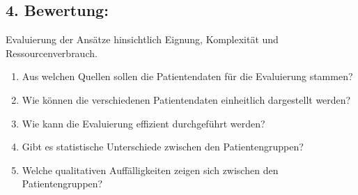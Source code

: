 \subsection{4. Bewertung:} Evaluierung der Ansätze hinsichtlich Eignung, Komplexität und Ressourcenverbrauch.
\begin{enumerate}[label=4.\arabic*]
    \item Aus welchen Quellen sollen die Patientendaten für die Evaluierung stammen? 
    \item Wie können die verschiedenen Patientendaten einheitlich dargestellt werden?
    \item Wie kann die Evaluierung effizient durchgeführt werden?
    \item Gibt es statistische Unterschiede zwischen den Patientengruppen?
    \item Welche qualitativen Auffälligkeiten zeigen sich zwischen den Patientengruppen?
\end{enumerate}

